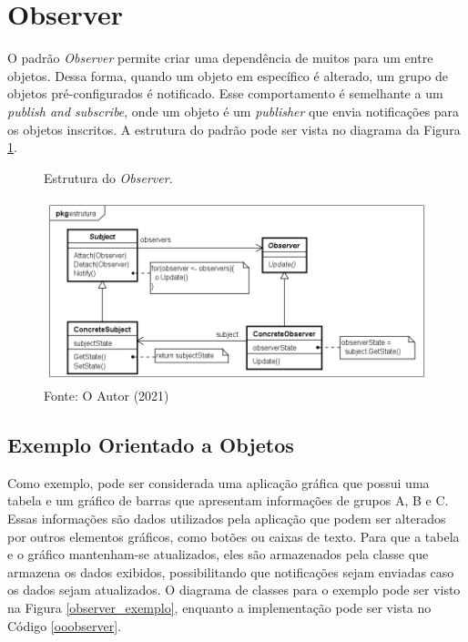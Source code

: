 \section{Observer}

O padrão \textit{Observer} permite criar uma dependência de muitos 
para um entre objetos. Dessa forma, quando um 
objeto em específico é alterado, um grupo de objetos 
pré-configurados é notificado. Esse comportamento é 
semelhante a um \textit{publish and subscribe}, onde 
um objeto é um \textit{publisher} que envia notificações 
para os objetos inscritos. A estrutura do padrão pode ser 
vista no diagrama da Figura \ref{observer_struct}.\cite{gamma:1995}

\begin{figure}[htb]
	\caption{\label{observer_struct}Estrutura do \textit{Observer}.}
	\begin{center}
	    \includegraphics[scale=0.5]{5_padroes-contexto-funcional/5.3_comportamentais/5.3.07_observer/observer_estrutura.png}
	\end{center}
  \caption*{Fonte: O Autor (2021)}
\end{figure}

\subsection*{Exemplo Orientado a Objetos}

Como exemplo, pode ser considerada uma aplicação 
gráfica que possui uma tabela e um gráfico de 
barras que apresentam informações de grupos 
A, B e C. Essas informações são dados utilizados 
pela aplicação que podem ser alterados por outros 
elementos gráficos, como botões ou caixas de texto. 
Para que a tabela e o gráfico mantenham-se atualizados, 
eles são armazenados pela classe que armazena 
os dados exibidos, possibilitando que 
notificações sejam enviadas 
caso os dados sejam atualizados. O diagrama 
de classes para o exemplo pode ser visto na Figura 
\ref{observer_exemplo}, enquanto a implementação 
pode ser vista no Código \ref{ooobserver}.


